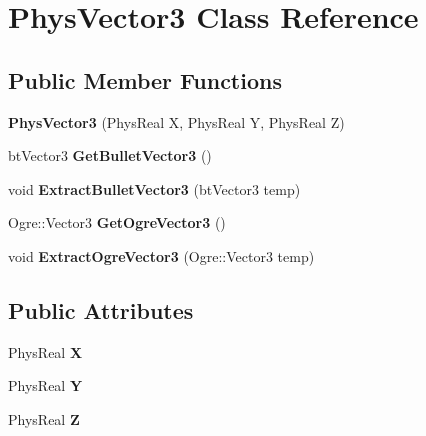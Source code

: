 \hypertarget{classPhysVector3}{
\section{PhysVector3 Class Reference}
\label{da/d11/classPhysVector3}
}
\subsection*{Public Member Functions}
\begin{DoxyCompactItemize}
\item 
\hypertarget{classPhysVector3_aad8161121a45b20dde0e3cc6959801be}{
{\bfseries PhysVector3} (PhysReal X, PhysReal Y, PhysReal Z)}
\label{da/d11/classPhysVector3_aad8161121a45b20dde0e3cc6959801be}

\item 
\hypertarget{classPhysVector3_adfc5f9e933a94be994ce5ce0c38d1f96}{
btVector3 {\bfseries GetBulletVector3} ()}
\label{da/d11/classPhysVector3_adfc5f9e933a94be994ce5ce0c38d1f96}

\item 
\hypertarget{classPhysVector3_a71a78da9e8011cb727010f8ba3acf546}{
void {\bfseries ExtractBulletVector3} (btVector3 temp)}
\label{da/d11/classPhysVector3_a71a78da9e8011cb727010f8ba3acf546}

\item 
\hypertarget{classPhysVector3_a01facc2b865bb79c589ed1985dd6c49c}{
Ogre::Vector3 {\bfseries GetOgreVector3} ()}
\label{da/d11/classPhysVector3_a01facc2b865bb79c589ed1985dd6c49c}

\item 
\hypertarget{classPhysVector3_a422acbc95f72d00a26cb477ab7db5e87}{
void {\bfseries ExtractOgreVector3} (Ogre::Vector3 temp)}
\label{da/d11/classPhysVector3_a422acbc95f72d00a26cb477ab7db5e87}

\end{DoxyCompactItemize}
\subsection*{Public Attributes}
\begin{DoxyCompactItemize}
\item 
\hypertarget{classPhysVector3_ac4586254a6116c616046bd9d5b35ca31}{
PhysReal {\bfseries X}}
\label{da/d11/classPhysVector3_ac4586254a6116c616046bd9d5b35ca31}

\item 
\hypertarget{classPhysVector3_a9bf4609392a492c2b3e278d635ed976a}{
PhysReal {\bfseries Y}}
\label{da/d11/classPhysVector3_a9bf4609392a492c2b3e278d635ed976a}

\item 
\hypertarget{classPhysVector3_a0c0585976cb4c215626e205a2c663226}{
PhysReal {\bfseries Z}}
\label{da/d11/classPhysVector3_a0c0585976cb4c215626e205a2c663226}

\end{DoxyCompactItemize}


